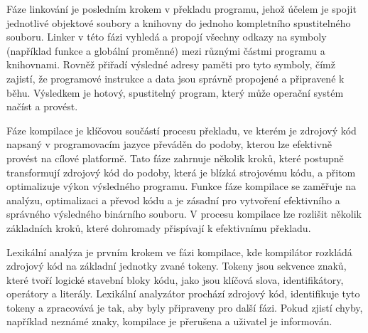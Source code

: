 Fáze linkování je posledním krokem v překladu programu, jehož účelem je spojit jednotlivé objektové soubory a knihovny do jednoho kompletního spustitelného souboru. Linker v této fázi vyhledá a propojí všechny odkazy na symboly (například funkce a globální proměnné) mezi různými částmi programu a knihovnami. Rovněž přiřadí výsledné adresy paměti pro tyto symboly, čímž zajistí, že programové instrukce a data jsou správně propojené a připravené k běhu. Výsledkem je hotový, spustitelný program, který může operační systém načíst a provést.

Fáze kompilace je klíčovou součástí procesu překladu, ve kterém je zdrojový kód napsaný v programovacím jazyce převáděn do podoby, kterou lze efektivně provést na cílové platformě. Tato fáze zahrnuje několik kroků, které postupně transformují zdrojový kód do podoby, která je blízká strojovému kódu, a přitom optimalizuje výkon výsledného programu. Funkce fáze kompilace se zaměřuje na analýzu, optimalizaci a převod kódu a je zásadní pro vytvoření efektivního a správného výsledného binárního souboru. V procesu kompilace lze rozlišit několik základních kroků, které dohromady přispívají k efektivnímu překladu.

Lexikální analýza je prvním krokem ve fázi kompilace, kde kompilátor rozkládá zdrojový kód na základní jednotky zvané tokeny. Tokeny jsou sekvence znaků, které tvoří logické stavební bloky kódu, jako jsou klíčová slova, identifikátory, operátory a literály. Lexikální analyzátor prochází zdrojový kód, identifikuje tyto tokeny a zpracovává je tak, aby byly připraveny pro další fázi. Pokud zjistí chyby, například neznámé znaky, kompilace je přerušena a uživatel je informován.

\hfil\pdfrefximage\compilesteps\hfil

